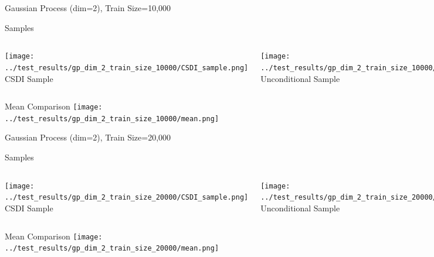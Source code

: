 \documentclass[8pt]{beamer}
\renewcommand{\|}{\ensuremath{\hspace{0.1cm} | \hspace{0.1cm}}}
\begin{document}
    \begin{frame}{Gaussian Process (dim=2), Train Size=10,000}
    \begin{block}{Samples}
    \begin{columns}
        \centering
        \texttt{[image: ../test\_results/gp\_dim\_2\_train\_size\_10000/CSDI\_sample.png]}
        CSDI Sample
        
        \centering
        \texttt{[image: ../test\_results/gp\_dim\_2\_train\_size\_10000/UNCOND\_sample.png]}
        Unconditional Sample
    \end{columns}
    \end{block}

    \begin{block}{Mean Comparison}
    \centering
    \texttt{[image: ../test\_results/gp\_dim\_2\_train\_size\_10000/mean.png]}
    \end{block}
    \end{frame}

    \begin{frame}{Gaussian Process (dim=2), Train Size=20,000}
    \begin{block}{Samples}
    \begin{columns}
        \centering
        \texttt{[image: ../test\_results/gp\_dim\_2\_train\_size\_20000/CSDI\_sample.png]}
        CSDI Sample
        
        \centering
        \texttt{[image: ../test\_results/gp\_dim\_2\_train\_size\_20000/UNCOND\_sample.png]}
        Unconditional Sample
    \end{columns}
    \end{block}

    \begin{block}{Mean Comparison}
    \centering
    \texttt{[image: ../test\_results/gp\_dim\_2\_train\_size\_20000/mean.png]}
    \end{block}
    \end{frame}
\end{document}
